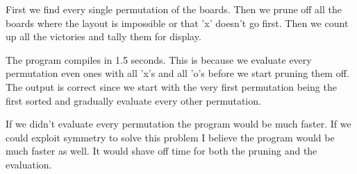 \documentclass{article}
\begin{document}

First we find every single permutation of the boards. Then we prune off all the boards where the layout is impossible or that 'x' doesn't go first. Then we count up all the victories and tally them for display. \par
\par
The program compiles in 1.5 seconds. This is because we evaluate every permutation even ones with all 'x's and all 'o's before we start pruning them off. The output is correct since we start with the very first permutation being the first sorted and gradually evaluate every other permutation. \par
\par
If we didn't evaluate every permutation the program would be much faster. If we could exploit symmetry to solve this problem I believe the program would be much faster as well. It would shave off time for both the pruning and the evaluation. 
\end{document}
